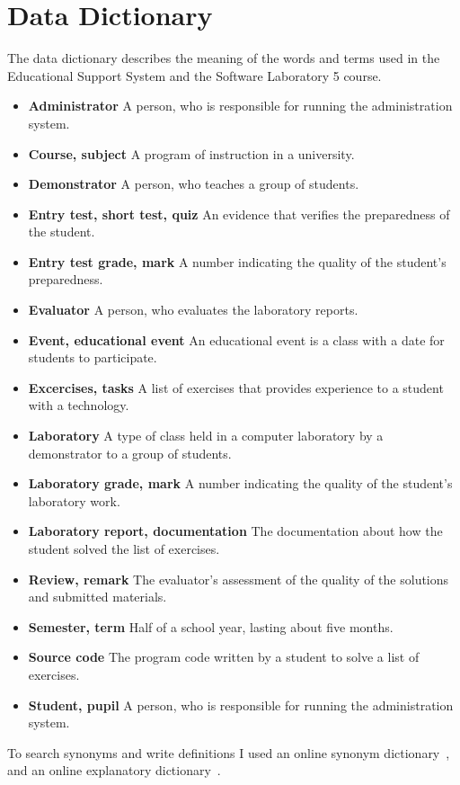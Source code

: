 \chapter{Data Dictionary}

The data dictionary describes the meaning of the words and terms used in the Educational Support System and the Software Laboratory 5 course.

\begin{itemize}
	\item \textbf{Administrator} A person, who is responsible for running the administration system.
	\item \textbf{Course, subject} A program of instruction in a university.
	\item \textbf{Demonstrator} A person, who teaches a group of students.
	\item \textbf{Entry test, short test, quiz} An evidence that verifies the preparedness of the student.
	\item \textbf{Entry test grade, mark} A number indicating the quality of the student's preparedness.
	\item \textbf{Evaluator} A person, who evaluates the laboratory reports.
	\item \textbf{Event, educational event} An educational event is a class with a date for students to participate.
	\item \textbf{Excercises, tasks} A list of exercises that provides experience to a student with a technology.
	\item \textbf{Laboratory} A type of class held in a computer laboratory by a demonstrator to a group of students.
	\item \textbf{Laboratory grade, mark} A number indicating the quality of the student's laboratory work.
	\item \textbf{Laboratory report, documentation} The documentation about how the student  solved the list of exercises.
	\item \textbf{Review, remark} The evaluator's assessment of the quality of the solutions and submitted materials.
	\item \textbf{Semester, term} Half of a school year, lasting about five months.
	\item \textbf{Source code} The program code written by a student to solve a list of exercises.
	\item \textbf{Student, pupil} A person, who is responsible for running the administration system.
\end{itemize}

To search synonyms and write definitions I used an online synonym dictionary~\cite{Thesaurus}, and an online explanatory  dictionary~\cite{Dictionary}.